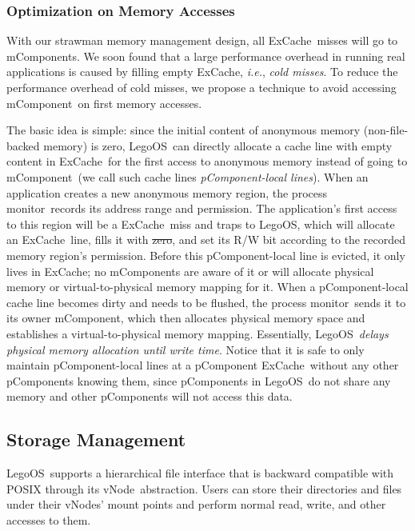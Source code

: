 \documentclass[10pt,times,twocolumn]{z2-article}
\renewcommand{\em}{\it}
\newcommand{\ie}{\textit{i.e.}}
\newcommand{\lego}{LegoOS}
\newcommand{\vnode}{vNode}
\newcommand{\excache}{ExCache}
\newcommand{\microos}{monitor}
\newcommand{\pcomponent}{pComponent}
\newcommand{\mcomponent}{mComponent}
\providecommand{\DIFaddtex}[1]{{\protect\color{blue}\uwave{#1}}} %
\providecommand{\DIFdeltex}[1]{{\protect\color{red}\sout{#1}}}                      %
\providecommand{\DIFaddbegin}{} %
\providecommand{\DIFaddend}{} %
\providecommand{\DIFdelbegin}{} %
\providecommand{\DIFdelend}{} %
\providecommand{\DIFadd}[1]{\texorpdfstring{\DIFaddtex{#1}}{#1}} %
\providecommand{\DIFdel}[1]{\texorpdfstring{\DIFdeltex{#1}}{}} %
\newcommand{\DIFscaledelfig}{0.5}
\newlength{\DIFdelgraphicswidth} %
\newlength{\DIFdelgraphicsheight} %
\newcommand{\DIFaddincludegraphics}[2][]{{\color{blue}\fbox{\DIFOincludegraphics[#1]{#2}}}} %
\newcommand{\DIFdelincludegraphics}[2][]{%
\sbox{\DIFdelgraphicsbox}{\DIFOincludegraphics[#1]{#2}}%
\settoboxwidth{\DIFdelgraphicswidth}{\DIFdelgraphicsbox} %
\settoboxtotalheight{\DIFdelgraphicsheight}{\DIFdelgraphicsbox} %
\scalebox{\DIFscaledelfig}{%
\parbox[b]{\DIFdelgraphicswidth}{\usebox{\DIFdelgraphicsbox}\\[-\baselineskip] \rule{\DIFdelgraphicswidth}{0em}}\llap{\resizebox{\DIFdelgraphicswidth}{\DIFdelgraphicsheight}{%
\setlength{\unitlength}{\DIFdelgraphicswidth}%
\begin{picture}(1,1)%
\thicklines\linethickness{2pt} %
{\color[rgb]{1,0,0}\put(0,0){\framebox(1,1){}}}%
{\color[rgb]{1,0,0}\put(0,0){\line( 1,1){1}}}%
{\color[rgb]{1,0,0}\put(0,1){\line(1,-1){1}}}%
\end{picture}%
}\hspace*{3pt}}} %
} %
\DeclareRobustCommand{\DIFaddbegin}{\DIFOaddbegin \let\includegraphics\DIFaddincludegraphics} %
\DeclareRobustCommand{\DIFaddend}{\DIFOaddend \let\includegraphics\DIFOincludegraphics} %
\DeclareRobustCommand{\DIFdelbegin}{\DIFOdelbegin \let\includegraphics\DIFdelincludegraphics} %
\DeclareRobustCommand{\DIFdelend}{\DIFOaddend \let\includegraphics\DIFOincludegraphics} %
\begin{document}
{{{{{{{\subsubsection{Optimization on Memory Accesses}
\label{sec:zerofill}
With our strawman memory management design, 
all \excache\ misses will go to \mcomponent{}s.
We soon found that a large performance overhead in running real applications 
is caused by filling empty \excache, \ie, {\em cold misses}.
To reduce the performance overhead of cold misses, we propose a technique 
to avoid accessing \mcomponent\ on first memory accesses.

The basic idea is simple: since the initial content of anonymous memory 
(non-file-backed memory) is zero, %
\lego\ can directly allocate a cache line with empty content
in \excache\ for the first access to 
anonymous memory instead of going to \mcomponent\
(we call such cache lines {\em \pcomponent{}-local lines}).
When an application creates a new anonymous memory region, the process \microos\ records its address range and permission.
The application's first access to this region will be a \excache\ miss and traps to \lego,
which will allocate an \excache\ line, fills it with \DIFdelbegin \DIFdel{zero}\DIFdelend \DIFaddbegin \DIFadd{zeros}\DIFaddend , 
and set its R/W bit according to the recorded memory region's permission.
Before this \pcomponent{}-local line is evicted, it only lives in \excache;
no \mcomponent{}s are aware of it or will allocate physical memory or \DIFaddbegin \DIFadd{a }\DIFaddend virtual-to-physical memory mapping for it.
When a \pcomponent{}-local cache line becomes dirty and needs to be flushed, 
the process \microos\ sends it to its owner \mcomponent, which then
allocates physical memory space and establishes a virtual-to-physical memory mapping.
Essentially, \lego\ {\em delays physical memory allocation until write time}.
Notice that it is safe to only maintain \pcomponent{}-local lines at a \pcomponent{} \excache\ 
without any other \pcomponent{}s knowing them, 
since \pcomponent{}s in \lego\ do not share any memory
and other \pcomponent{}s will not access this data.

\subsection{Storage Management}
\lego\ supports a hierarchical file interface that is backward compatible with POSIX 
through its \vnode\ abstraction. 
Users can store their directories and files under their \vnode{}s' mount points
and perform normal read, write, and other accesses to them.

}}}}}}}
\end{document}
